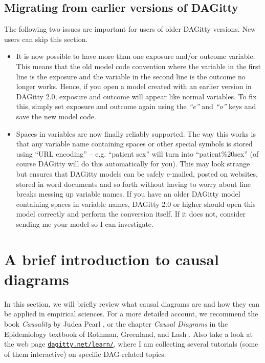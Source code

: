 \documentclass[a4paper,10pt]{article}
\newcommand{\pname}{{\sc DAG}itty\xspace}
\newcommand{\action}[1]{\emph{``#1''}}
\begin{document}
\subsection{Migrating from earlier versions of \pname}

The following two issues are important for users of older \pname versions. New users
can skip this section.

\begin{itemize}
 \item It is now possible to have more than one exposure and/or outcome variable. 
This means that the old model code convention where the variable in the first line is the 
exposure and the variable in the second line is the outcome no longer works. Hence,
if you open a model created with an earlier version in \pname 2.0, 
exposure and outcome will appear like normal variables. To fix this, 
simply set exposure and outcome again
using the \action{e} and \action{o} keys  and save the new model code.

 \item Spaces in variables are now finally reliably supported. The way this works
is that any variable name containing spaces or other special symbols is stored
using ``URL encoding'' -- e.g. ``patient sex'' will turn into ``patient\%20sex''
(of course \pname will do this automatically for you). 
This may look strange but ensures that \pname models can be safely e-mailed, posted
on websites, stored in word documents and so forth without having to worry about line 
breaks messing up variable names. 
If you have an older \pname model containing spaces in variable names,
\pname 2.0 or higher should open this model correctly and perform the conversion itself. If
it does not, consider sending me your model so I can investigate.
\end{itemize}

\section{A brief introduction to causal diagrams}

\label{sec:dagintro}

In this section, we will briefly review what causal diagrams are and how they can be 
applied in empirical sciences. For a more detailed account, we recommend 
the book \emph{Causality} by Judea Pearl \cite{Pearl2009}, or the 
chapter \emph{Causal Diagrams} in the Epidemiology 
textbook of Rothman, Greenland, and Lash \cite{RothmanGL2008}. 
Also take a look at the web page 
\href{http://www.dagitty.net/learn/}{\tt dagitty.net/learn/},
where I am collecting several tutorials (some of them interactive) on specific DAG-related 
topics.
 
\end{document}
